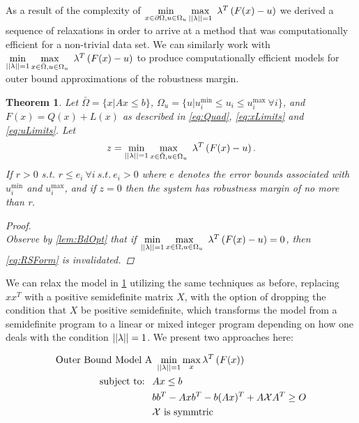\documentclass[11pt]{article}
\theoremstyle{plain}
\newtheorem{thm}{Theorem}[section]
\theoremstyle{definition}
\theoremstyle{remark}
\begin{document}
As a result of the complexity of $\min\limits_{x\in \partial \Omega, u\in\Omega_u}\max\limits_{||\bold{\lambda}||=1}\ \bold{\lambda}^T\left(F(x)-u\right)$ we derived a sequence of relaxations in order to arrive at a method that was computationally efficient for a non-trivial data set. We can similarly work with $\min\limits_{||\bold{\lambda}||=1}\max\limits_{x\in \bar{\Omega}, u\in\Omega_u}\ \bold{\lambda}^T\left(F(x)-u\right)$ to produce computationally efficient models for outer bound approximations of the robustness margin. \\
\begin{thm}\label{thm:OPTfeasOut} 
Let $\bar{\Omega}=\{x| Ax\leq b\}$, $\Omega_{u}=\{u| u^{\min}_i\leq u_i \leq u^{\max}_i \ \forall i \}$, and $F(x)=Q(x)+L(x)$ as described in \eqref{eq:Quad}, \eqref{eq:xLimits} and \eqref{eq:uLimits}. Let
$$z = \min\limits_{||\bold{\lambda}||=1}\max\limits_{x\in \bar{\Omega}, u\in\Omega_u}\ \bold{\lambda}^T\left(F(x)-u\right).$$
If $r>0$ s.t. $r\leq e_i \ \forall i \ s.t. \ e_i>0$ where $e$ denotes the error bounds associated with $ u^{\min}_i$ and $ u^{\max}_i$, and if $z=0$ then the system has robustness margin of no more than r.

\begin{proof} \ \\
Observe by \cref{lem:BdOpt} that if $\min\limits_{||\bold{\lambda}||=1}\max\limits_{x\in \Omega, u\in\Omega_u}\ \bold{\lambda}^T\left(F(x)-u\right)=0$, then \eqref{eq:RSForm} is invalidated.  

\end{proof}
\end{thm}

We can relax the model in \cref{thm:OPTfeasOut} utilizing the same techniques as before, replacing $xx^T$ with a positive semidefinite matrix $X$, with the option of dropping the condition that $X$ be positive semidefinite, which transforms the model from a semidefinite program to a linear or mixed integer program depending on how one deals with the condition $||\bold{\lambda}||=1$. We present two approaches here:

\begin{subequations}\label{eq:OPTfeasOutRelaxa}
\begin{align}
\text{Outer Bound Model A}& \ \min\limits_{||\bold{\lambda}||=1}\max\limits_{x}  \bold{\lambda}^T\left(F(x)\right)\\
 \text{subject to: } \ & Ax\leq b \\
 	&bb^T-Axb^T-b(Ax)^T+A\mathcal{X}A^T\geq O \\
 	&\mathcal{X} \text{ is symmtric}
\end{align}
\end{subequations}
\end{document}
